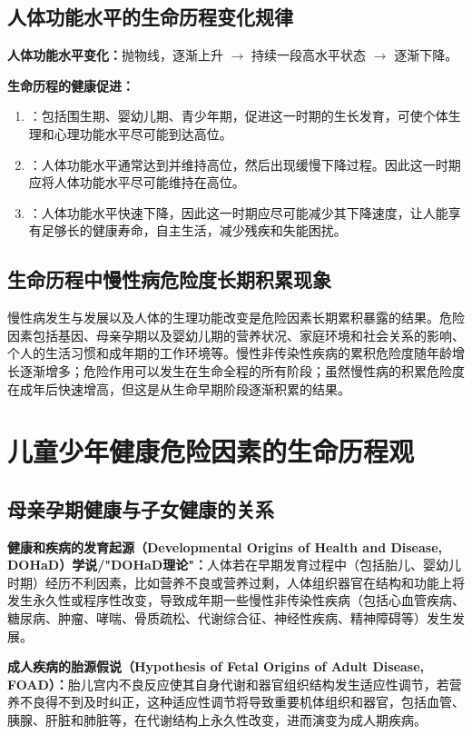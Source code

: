 \subsection{人体功能水平的生命历程变化规律}

\begin{defbox}
\textbf{人体功能水平变化：}抛物线，逐渐上升 \(\to\) 持续一段高水平状态 \(\to\) 逐渐下降。

\textbf{生命历程的健康促进：}

\begin{enumerate}[leftmargin=*]
    \item {}：包括围生期、婴幼儿期、青少年期，促进这一时期的生长发育，可使个体生理和心理功能水平尽可能到达高位。
    \item {}：人体功能水平通常达到并维持高位，然后出现缓慢下降过程。因此这一时期应将人体功能水平尽可能维持在高位。
    \item {}：人体功能水平快速下降，因此这一时期应尽可能减少其下降速度，让人能享有足够长的健康寿命，自主生活，减少残疾和失能困扰。
\end{enumerate}
\end{defbox}

\subsection{生命历程中慢性病危险度长期积累现象}

\begin{defbox}
慢性病发生与发展以及人体的生理功能改变是危险因素长期累积暴露的结果。危险因素包括基因、母亲孕期以及婴幼儿期的营养状况、家庭环境和社会关系的影响、个人的生活习惯和成年期的工作环境等。慢性非传染性疾病的累积危险度随年龄增长逐渐增多；危险作用可以发生在生命全程的所有阶段；虽然慢性病的积累危险度在成年后快速增高，但这是从生命早期阶段逐渐积累的结果。
\end{defbox}

\section{儿童少年健康危险因素的生命历程观}
\label{sec:risk-factors}

\subsection{母亲孕期健康与子女健康的关系}

\begin{keybox}
\textbf{健康和疾病的发育起源（Developmental Origins of Health and Disease, DOHaD）学说/"DOHaD理论"：}人体若在早期发育过程中（包括胎儿、婴幼儿时期）经历不利因素，比如营养不良或营养过剩，人体组织器官在结构和功能上将发生永久性或程序性改变，导致成年期一些慢性非传染性疾病（包括心血管疾病、糖尿病、肿瘤、哮喘、骨质疏松、代谢综合征、神经性疾病、精神障碍等）发生发展。

\textbf{成人疾病的胎源假说（Hypothesis of Fetal Origins of Adult Disease, FOAD）：}胎儿宫内不良反应使其自身代谢和器官组织结构发生适应性调节，若营养不良得不到及时纠正，这种适应性调节将导致重要机体组织和器官，包括血管、胰腺、肝脏和肺脏等，在代谢结构上永久性改变，进而演变为成人期疾病。
\end{keybox}

